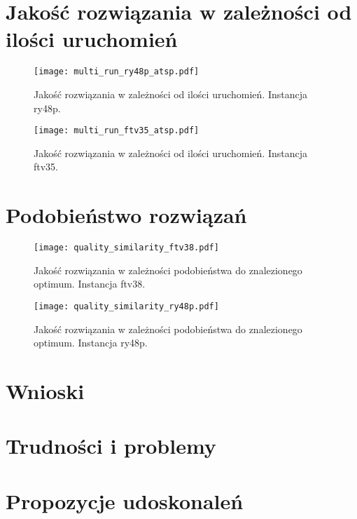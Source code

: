 \documentclass{article}
\begin{document}
\section{Jakość rozwiązania w zależności od ilości uruchomień}


\begin{figure}
    \begin{center}
        \texttt{[image: multi\_run\_ry48p\_atsp.pdf]}
    \end{center}
    \caption{Jakość rozwiązania w zależności od ilości uruchomień. Instancja ry48p.}
    \label{fig:plot_multi_run_ry48p}
\end{figure}

\begin{figure}
    \begin{center}
        \texttt{[image: multi\_run\_ftv35\_atsp.pdf]}
    \end{center}
    \caption{Jakość rozwiązania w zależności od ilości uruchomień. Instancja ftv35.}
    \label{fig:plot_multi_run_ry48p}
\end{figure}


\section{Podobieństwo rozwiązań}

\begin{figure}
    \begin{center}
        \texttt{[image: quality\_similarity\_ftv38.pdf]}
    \end{center}
    \caption{Jakość rozwiązania w zależności podobieństwa do znalezionego optimum. Instancja ftv38.}
    \label{fig:quality_sim_ftv38}
\end{figure}

\begin{figure}
    \begin{center}
        \texttt{[image: quality\_similarity\_ry48p.pdf]}
    \end{center}
    \caption{Jakość rozwiązania w zależności podobieństwa do znalezionego optimum. Instancja ry48p.}
    \label{fig:quality_sim_ry48p}
\end{figure}

\section{Wnioski}

\section{Trudności i problemy}

\section{Propozycje udoskonaleń}

\clearpage



\end{document}
